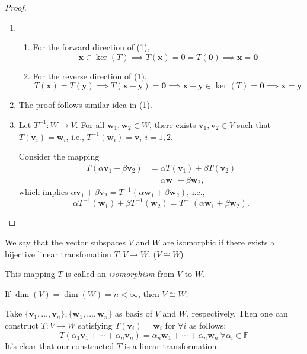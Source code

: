 \begin{proof}
\begin{enumerate}
\item
\begin{enumerate}
\item

For the forward direction of (1),
\[
\bm x\in\ker(T)\implies
T(\bm x)=0=T(\bm0)\implies
\bm x=\bm0
\]
\item

For the reverse direction of (1),
\[
T(\bm x)=T(\bm y)\implies
T(\bm x-\bm y)=\bm0\implies
\bm x-\bm y\in\ker(T)=\bm0
\implies
\bm x=\bm y
\]

\end{enumerate}

\item
The proof follows similar idea in (1).

\item
Let $T^{-1}:W\to V$. 
For all $\bm w_1,\bm w_2\in W$, 
there exists $\bm v_1,\bm v_2\in V$ such that 
$T(\bm v_i)=\bm w_i$, i.e., $T^{-1}(\bm w_i)=\bm v_i$ $i=1,2$.

Consider the mapping
\begin{align*}
T(\alpha\bm v_1+\beta\bm v_2)&=\alpha T(\bm v_1)+\beta T(\bm v_2)\\
&=\alpha\bm w_1+\beta\bm w_2,
\end{align*}
which implies $\alpha\bm v_1+\beta\bm v_2=T^{-1}(\alpha\bm w_1+\beta\bm w_2)$, i.e.,
\[
\alpha T^{-1}(\bm w_1)+\beta T^{-1}(\bm w_2)
=
T^{-1}(\alpha\bm w_1+\beta\bm w_2).
\]
\end{enumerate}
\end{proof}



\begin{definition}[isomorphism]
We say that the vector subspaces $V$ and $W$ are isomorphic 
if there exists a bijective linear transfomation $T:V\to W$. ($V\cong W$)

This mapping $T$ is called an \emph{isomorphism} from $V$ to $W$.
\end{definition}

\begin{remark}
If $\dim(V)=\dim(W)=n<\infty$, then $V\cong W$:

Take $\{\bm v_1,\dots,\bm v_n\},\{\bm w_1,\dots,\bm w_n\}$ as basis of $V$ and $W$, respectively. Then one can construct $T:V\to W$ satisfying $T(\bm v_i)=\bm w_i$ for $\forall i$ as follows:
\[
T(\alpha_1\bm v_1+\cdots+\alpha_n\bm v_n)
=
\alpha_n\bm w_1+\cdots+\alpha_n\bm w_n\
\forall\alpha_i\in\mathbb{F}
\]
It's clear that our constructed $T$ is a linear transformation.
\end{remark}

